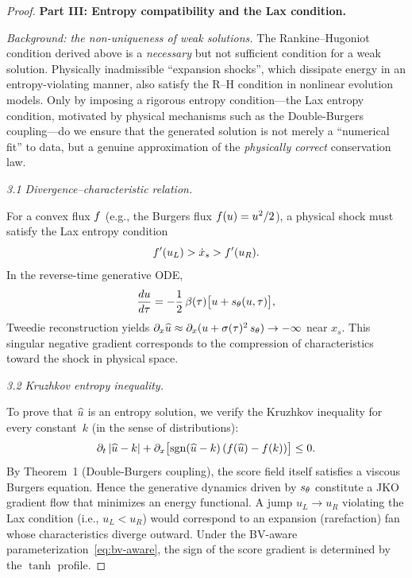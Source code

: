 \begin{proof}
\medskip
\noindent\textbf{Part III: Entropy compatibility and the Lax condition.}

\smallskip
\noindent\textit{Background: the non-uniqueness of weak solutions.}
The Rankine--Hugoniot condition derived above is a \emph{necessary} but not sufficient
condition for a weak solution.
Physically inadmissible ``expansion shocks'', which dissipate energy in an
entropy-violating manner, also satisfy the R--H condition in nonlinear evolution models.
Only by imposing a rigorous entropy condition---the Lax entropy condition, motivated by
physical mechanisms such as the Double-Burgers coupling---do we ensure that the generated
solution is not merely a ``numerical fit'' to data, but a genuine approximation of the
\emph{physically correct} conservation law.

\smallskip
\noindent\textit{3.1  Divergence--characteristic relation.}

For a convex flux $f$ (e.g., the Burgers flux $f(u)=u^{2}/2$), a physical shock
must satisfy the Lax entropy condition
\begin{equation}
\label{eq:lax}
f'(u_{L}) > \dot x_{s} > f'(u_{R}).
\end{equation}
In the reverse-time generative ODE,
\begin{equation}
\frac{du}{d\tau} = -\frac12\,\beta(\tau)\bigl[ u + s_{\theta}(u,\tau) \bigr],
\end{equation}
Tweedie reconstruction yields
$\partial_{x}\widehat{u} \approx \partial_{x}(u + \sigma(\tau)^{2}\,s_{\theta}) \to -\infty$
near $x_{s}$.
This singular negative gradient corresponds to the compression of characteristics
toward the shock in physical space.

\smallskip
\noindent\textit{3.2  Kruzhkov entropy inequality.}

To prove that $\widehat{u}$ is an entropy solution, we verify the Kruzhkov inequality for every
constant~$k$ (in the sense of distributions):
\begin{equation}
\label{eq:kruz}
\partial_{t}\,\lvert \widehat{u} - k \rvert
  + \partial_{x}\bigl[ \operatorname{sgn}(\widehat{u} - k)\,(f(\widehat{u}) - f(k)) \bigr]
  \le 0.
\end{equation}
By Theorem~1 (Double-Burgers coupling), the score field itself satisfies a viscous
Burgers equation.
Hence the generative dynamics driven by $s_{\theta}$ constitute a JKO gradient flow that
minimizes an energy functional.
A jump $u_{L} \to u_{R}$ violating the Lax condition (i.e., $u_{L} < u_{R}$) would
correspond to an expansion (rarefaction) fan whose characteristics diverge outward.
Under the BV-aware parameterization~\eqref{eq:bv-aware}, the sign of the score gradient is
determined by the $\tanh$ profile.


\end{proof}
